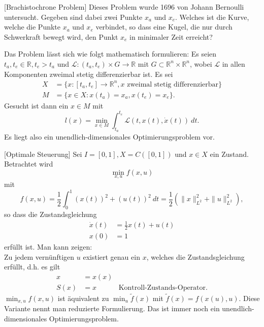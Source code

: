 \documentclass[main.tex]{subfiles}
\begin{document}
\begin{bsp}\label{1.2}[Brachistochrone Problem]
Dieses Problem wurde 1696 von Johann Bernoulli untersucht. Gegeben sind dabei zwei Punkte $x_a$ und $x_e$. Welches ist die Kurve, welche die Punkte $x_a$ und $x_e$ verbindet, so dass eine Kugel, die nur durch Schwerkraft bewegt wird, den Punkt $x_e$ in minimaler Zeit erreicht?

Das Problem lässt sich wie folgt mathematisch formulieren:
Es seien $t_a,t_e \in ℝ, t_e > t_a$ und $\mathcal L\colon (t_a, t_e) \times G \to ℝ$ mit $G \subset ℝ^n \times ℝ^n$, wobei $\mathcal L$ in allen Komponenten zweimal stetig differenzierbar ist. Es sei
\begin{align*}
    X&= \{ x: [t_a, t_e]\to ℝ^n, \text{$x$ zweimal stetig differenzierbar} \}\\
    M &= \{x\in X: x(t_a) = x_a, x(t_e) = x_e \}.
\end{align*}
Gesucht ist dann ein $x\in M$ mit
$$l(x) = \min_{x\in M} \int_{t_a}^{t_e} \mathcal L(t, x(t), \dot x(t) )~dt.$$
Es liegt also ein unendlich-dimensionales Optimierungsproblem vor.
\end{bsp}

\begin{bsp}\label{1.3}[Optimale Steuerung]
Sei $I = [0,1], X= C([0,1])$ und $x\in X$ ein Zustand.
Betrachtet wird
$$\min_{x,u} f(x,u)$$
mit 
$$f(x,u) = \frac{1}{2}\int_0^1 \left( x(t) \right)^2 + \left( u(t) \right)^2~dt = \frac{1}{2} \left( \|x\|_{L^2}^2 + \| u \|_{L^2}^2 \right),$$
so dass die Zustandsgleichung
\begin{align*}
    \dot x(t) &= \frac{1}{2} x(t) + u(t) \\
    x(0) &= 1
\end{align*}
erfüllt ist. Man kann zeigen:\\
Zu jedem vernünftigen $u$ existiert genau ein $x$, welches die Zustandsgleichung erfüllt, d.h. es gilt
\begin{align*}
    x &= x(x) \\
    S(x) &= x & \text{Kontroll-Zustands-Operator}.
\end{align*}
$\min_{x,u} f(x,u)$ ist äquivalent zu $\min_{u} \tilde f(x)$ mit $\tilde f(x) = f(x(u), u)$. Diese Variante nennt man reduzierte Formulierung. Das ist immer noch ein unendlich-dimensionales Optimierungsproblem.
\end{bsp}
\end{document}
